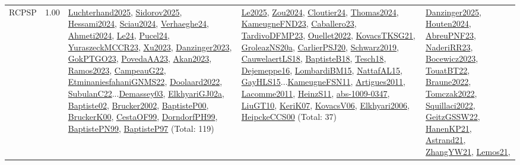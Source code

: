 {\begin{longtable}{p{3cm}r>{\raggedright\arraybackslash}p{6cm}>{\raggedright\arraybackslash}p{6cm}>{\raggedright\arraybackslash}p{8cm}}
\index{RCPSP}\index{Classification!RCPSP}RCPSP &  1.00 & \hyperref[detail:Luchterhand2025]{Luchterhand2025}, \hyperref[detail:Sidorov2025]{Sidorov2025}, \hyperref[detail:Hessami2024]{Hessami2024}, \hyperref[detail:Sciau2024]{Sciau2024}, \hyperref[detail:Verhaeghe24]{Verhaeghe24}, \hyperref[detail:Ahmeti2024]{Ahmeti2024}, \hyperref[detail:Le24]{Le24}, \hyperref[detail:Pucel24]{Pucel24}, \hyperref[detail:YuraszeckMCCR23]{YuraszeckMCCR23}, \hyperref[detail:Xu2023]{Xu2023}, \hyperref[detail:Danzinger2023]{Danzinger2023}, \hyperref[detail:GokPTGO23]{GokPTGO23}, \hyperref[detail:PovedaAA23]{PovedaAA23}, \hyperref[detail:Akan2023]{Akan2023}, \hyperref[detail:Ramos2023]{Ramos2023}, \hyperref[detail:CampeauG22]{CampeauG22}, \hyperref[detail:EtminaniesfahaniGNMS22]{EtminaniesfahaniGNMS22}, \hyperref[detail:Doolaard2022]{Doolaard2022}, \hyperref[detail:SubulanC22]{SubulanC22}...\hyperref[detail:Demassey03]{Demassey03}, \hyperref[detail:ElkhyariGJ02a]{ElkhyariGJ02a}, \hyperref[detail:Baptiste02]{Baptiste02}, \hyperref[detail:Brucker2002]{Brucker2002}, \hyperref[detail:BaptisteP00]{BaptisteP00}, \hyperref[detail:BruckerK00]{BruckerK00}, \hyperref[detail:CestaOF99]{CestaOF99}, \hyperref[detail:DorndorfPH99]{DorndorfPH99}, \hyperref[detail:BaptistePN99]{BaptistePN99}, \hyperref[detail:BaptisteP97]{BaptisteP97} (Total: 119) & \hyperref[detail:Le2025]{Le2025}, \hyperref[detail:Zou2024]{Zou2024}, \hyperref[detail:Cloutier24]{Cloutier24}, \hyperref[detail:Thomas2024]{Thomas2024}, \hyperref[detail:KameugneFND23]{KameugneFND23}, \hyperref[detail:Caballero23]{Caballero23}, \hyperref[detail:TardivoDFMP23]{TardivoDFMP23}, \hyperref[detail:Ouellet2022]{Ouellet2022}, \hyperref[detail:KovacsTKSG21]{KovacsTKSG21}, \hyperref[detail:GroleazNS20a]{GroleazNS20a}, \hyperref[detail:CarlierPSJ20]{CarlierPSJ20}, \hyperref[detail:Schwarz2019]{Schwarz2019}, \hyperref[detail:CauwelaertLS18]{CauwelaertLS18}, \hyperref[detail:BaptisteB18]{BaptisteB18}, \hyperref[detail:Tesch18]{Tesch18}, \hyperref[detail:Dejemeppe16]{Dejemeppe16}, \hyperref[detail:LombardiBM15]{LombardiBM15}, \hyperref[detail:NattafAL15]{NattafAL15}, \hyperref[detail:GayHLS15]{GayHLS15}...\hyperref[detail:KameugneFSN11]{KameugneFSN11}, \hyperref[detail:Artigues2011]{Artigues2011}, \hyperref[detail:Lacomme2011]{Lacomme2011}, \hyperref[detail:HeinzS11]{HeinzS11}, \hyperref[detail:abs-1009-0347]{abs-1009-0347}, \hyperref[detail:LiuGT10]{LiuGT10}, \hyperref[detail:KeriK07]{KeriK07}, \hyperref[detail:KovacsV06]{KovacsV06}, \hyperref[detail:Elkhyari2006]{Elkhyari2006}, \hyperref[detail:HeipckeCCS00]{HeipckeCCS00} (Total: 37) & \hyperref[detail:Danzinger2025]{Danzinger2025}, \hyperref[detail:Houten2024]{Houten2024}, \hyperref[detail:AbreuPNF23]{AbreuPNF23}, \hyperref[detail:NaderiRR23]{NaderiRR23}, \hyperref[detail:Bocewicz2023]{Bocewicz2023}, \hyperref[detail:TouatBT22]{TouatBT22}, \hyperref[detail:Braune2022]{Braune2022}, \hyperref[detail:Tomczak2022]{Tomczak2022}, \hyperref[detail:Squillaci2022]{Squillaci2022}, \hyperref[detail:GeitzGSSW22]{GeitzGSSW22}, \hyperref[detail:HanenKP21]{HanenKP21}, \hyperref[detail:Astrand21]{Astrand21}, \hyperref[detail:ZhangYW21]{ZhangYW21}, \hyperref[detail:Lemos21]{Lemos21}, 
\end{longtable}}
